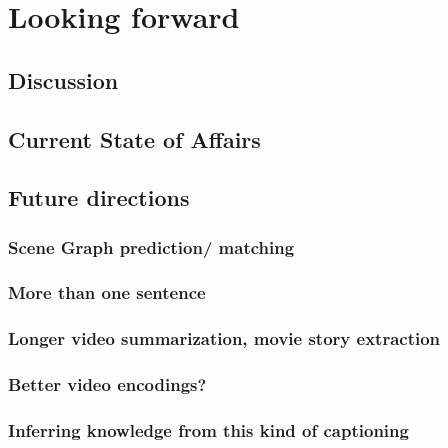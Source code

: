 \chapter{Looking forward}
\label{chapter:discussion}
\section{Discussion}
\section{Current State of Affairs}
\section{Future directions}
\subsection{Scene Graph prediction/ matching}
\subsection{More than one sentence}
\subsection{Longer video summarization, movie story extraction}
\subsection{Better video encodings?}
\subsection{Inferring knowledge from this kind of captioning}

